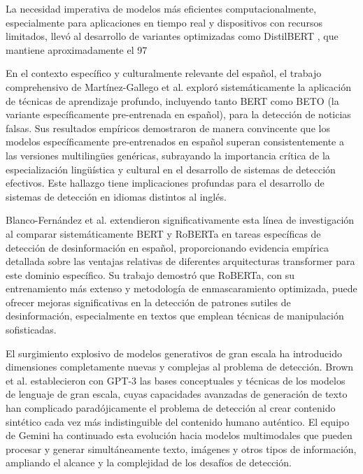 La necesidad imperativa de modelos más eficientes computacionalmente, especialmente para aplicaciones en tiempo real y dispositivos con recursos limitados, llevó al desarrollo de variantes optimizadas como DistilBERT \cite{sanh2019distilbert}, que mantiene aproximadamente el 97%

En el contexto específico y culturalmente relevante del español, el trabajo comprehensivo de Martínez-Gallego et al. \cite{martinez2021fake} exploró sistemáticamente la aplicación de técnicas de aprendizaje profundo, incluyendo tanto BERT como BETO (la variante específicamente pre-entrenada en español), para la detección de noticias falsas. Sus resultados empíricos demostraron de manera convincente que los modelos específicamente pre-entrenados en español superan consistentemente a las versiones multilingües genéricas, subrayando la importancia crítica de la especialización lingüística y cultural en el desarrollo de sistemas de detección efectivos. Este hallazgo tiene implicaciones profundas para el desarrollo de sistemas de detección en idiomas distintos al inglés.

Blanco-Fernández et al. \cite{blanco2024enhancing} extendieron significativamente esta línea de investigación al comparar sistemáticamente BERT y RoBERTa en tareas específicas de detección de desinformación en español, proporcionando evidencia empírica detallada sobre las ventajas relativas de diferentes arquitecturas transformer para este dominio específico. Su trabajo demostró que RoBERTa, con su entrenamiento más extenso y metodología de enmascaramiento optimizada, puede ofrecer mejoras significativas en la detección de patrones sutiles de desinformación, especialmente en textos que emplean técnicas de manipulación sofisticadas.

El surgimiento explosivo de modelos generativos de gran escala ha introducido dimensiones completamente nuevas y complejas al problema de detección. Brown et al. \cite{brown2020language} establecieron con GPT-3 las bases conceptuales y técnicas de los modelos de lenguaje de gran escala, cuyas capacidades avanzadas de generación de texto han complicado paradójicamente el problema de detección al crear contenido sintético cada vez más indistinguible del contenido humano auténtico. El equipo de Gemini \cite{gemini2023family} ha continuado esta evolución hacia modelos multimodales que pueden procesar y generar simultáneamente texto, imágenes y otros tipos de información, ampliando el alcance y la complejidad de los desafíos de detección.

